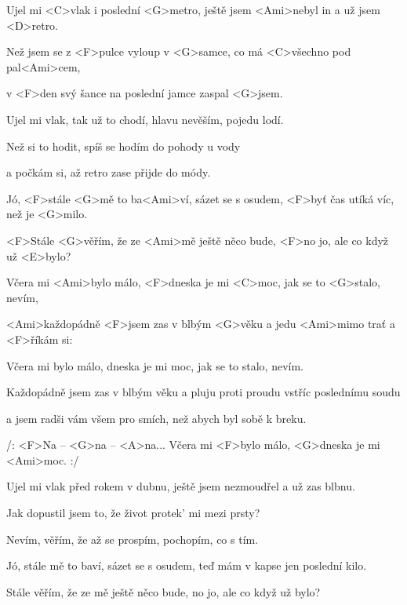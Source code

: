 

\zs
Ujel mi <C>vlak i poslední <G>metro, ještě jsem <Ami>nebyl in a už jsem <D>retro. 

Než jsem se z <F>pulce vyloup v <G>samce, co má <C>všechno pod pal<Ami>cem, 

v <F>den svý šance na poslední jamce zaspal <G>jsem. 
\ks

\zs
Ujel mi vlak, tak už to chodí, hlavu nevěším, pojedu lodí. 

Než si to hodit, spíš se hodím do pohody u vody 

a počkám si, až retro zase přijde do módy. 
\ks

\zs
Jó, <F>stále <G>mě to ba<Ami>ví, sázet se s osudem, <F>byť čas utíká víc, než je <G>milo. 

<F>Stále <G>věřím, že ze <Ami>mě ještě něco bude, <F>no jo, ale co když už <E>bylo? 
\ks

\zr
Včera mi <Ami>bylo málo, <F>dneska je mi <C>moc, jak se to <G>stalo, nevím, 

<Ami>každopádně <F>jsem zas v blbým <G>věku a jedu <Ami>mimo trať a <F>říkám si: 

Včera mi bylo málo, dneska je mi moc, jak se to stalo, nevím.

Každopádně jsem zas v blbým věku a pluju proti proudu vstříc poslednímu soudu 

a jsem radši vám všem pro smích, než abych byl sobě k breku. 



/: <F>Na -- <G>na -- <A>na... Včera mi <F>bylo málo, <G>dneska je mi <Ami>moc. :/
\kr

\zs
Ujel mi vlak před rokem v dubnu, ještě jsem nezmoudřel a už zas blbnu. 

Jak dopustil jsem to, že život protek' mi mezi prsty? 

Nevím, věřím, že až se prospím, pochopím, co s tím. 
\ks

\zs
Jó, stále mě to baví, sázet se s osudem, teď mám v kapse jen poslední kilo. 

Stále věřím, že ze mě ještě něco bude, no jo, ale co když už bylo? 
\ks

\zr
\kr

\zr
\kr

\kp
